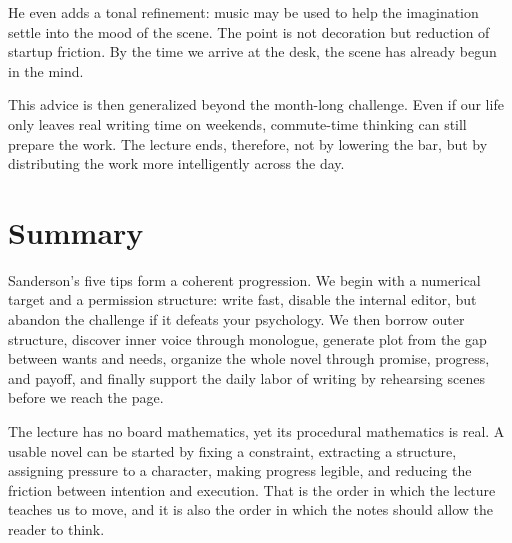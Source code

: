 He even adds a tonal refinement: music may be used to help the imagination settle into the mood of the scene. The point is not decoration but reduction of startup friction. By the time we arrive at the desk, the scene has already begun in the mind.

This advice is then generalized beyond the month-long challenge. Even if our life only leaves real writing time on weekends, commute-time thinking can still prepare the work. The lecture ends, therefore, not by lowering the bar, but by distributing the work more intelligently across the day.

\section{Summary}

Sanderson's five tips form a coherent progression. We begin with a numerical target and a permission structure: write fast, disable the internal editor, but abandon the challenge if it defeats your psychology. We then borrow outer structure, discover inner voice through monologue, generate plot from the gap between wants and needs, organize the whole novel through promise, progress, and payoff, and finally support the daily labor of writing by rehearsing scenes before we reach the page.

The lecture has no board mathematics, yet its procedural mathematics is real. A usable novel can be started by fixing a constraint, extracting a structure, assigning pressure to a character, making progress legible, and reducing the friction between intention and execution. That is the order in which the lecture teaches us to move, and it is also the order in which the notes should allow the reader to think.